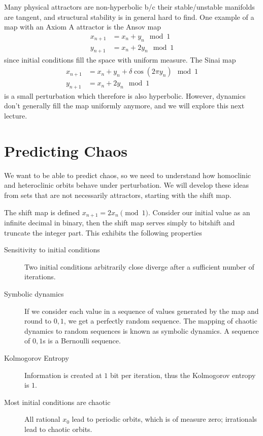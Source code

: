 \documentclass[12pt]{article}
\begin{document}
Many physical attractors are non-hyperbolic b/c their stable/unstable manifolds
are tangent, and structural stability is in general hard to find. One example of
a map with an Axiom A attractor is the Ansov map
\begin{align}
    x_{n+1} &= x_n + y_n \mod 1\\
    y_{n+1} &= x_n + 2y_n \mod 1
\end{align}
since initial conditions fill the space with uniform measure. The Sinai map
\begin{align}
    x_{n+1} &= x_n + y_n + \delta \cos\left( 2\pi y_n \right)\mod 1\\
    y_{n+1} &= x_n + 2y_n \mod 1
\end{align}
is a small perturbation which therefore is also hyperbolic. However, dynamics
don't generally fill the map uniformly anymore, and we will explore this
next lecture.

\clearpage

\section{Predicting Chaos}

We want to be able to predict chaos, so we need to understand how homoclinic and
heteroclinic orbits behave under perturbation. We will develop these ideas from
sets that are not necessarily attractors, starting with the shift map.

The shift map is defined $x_{n+1} = 2x_n \pmod 1$. Consider our initial value as
an infinite decimal in binary, then the shift map serves simply to bitshift and
truncate the integer part. This exhibits the following properties
\begin{description}
    \item[Sensitivity to initial conditions] Two initial conditions arbitrarily
        close diverge after a sufficient number of iterations.

    \item[Symbolic dynamics] If we consider each value in a sequence of values
        generated by the map and round to $0,1$, we get a perfectly random
        sequence. The mapping of chaotic dynamics to random sequences is known
        as symbolic dynamics. A sequence of $0,1$s is a Bernoulli sequence.

    \item[Kolmogorov Entropy] Information is created at $1$ bit per iteration,
        thus the Kolmogorov entropy is $1$.

    \item[Most initial conditions are chaotic] All rational $x_0$ lead to
        periodic orbits, which is of measure zero; irrationals lead to chaotic
        orbits.
\end{description}
\end{document}
